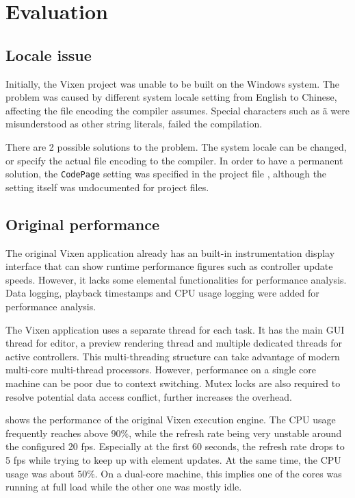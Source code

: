 \chapter{Evaluation}
\renewcommand{\baselinestretch}{\mystretch}
\label{chap:Eval}

\section{Locale issue}

Initially, the Vixen project was unable to be built on the Windows system. The problem was caused by different system locale setting from English to Chinese, affecting the file encoding the compiler assumes. Special characters such as \"a were misunderstood as other string literals, failed the compilation.

There are 2 possible solutions to the problem. The system locale can be changed, or specify the actual file encoding to the compiler. In order to have a permanent solution, the \texttt{CodePage} setting was specified in the project file \cite{codepage}, although the setting itself was undocumented for project files.

\section{Original performance}

The original Vixen application already has an built-in instrumentation display interface that can show runtime performance figures such as controller update speeds. However, it lacks some elemental functionalities for performance analysis. Data logging, playback timestamps and CPU usage logging were added for performance analysis.

The Vixen application uses a separate thread for each task. It has the main GUI thread for editor, a preview rendering thread and multiple dedicated threads for active controllers. This multi-threading structure can take advantage of modern multi-core multi-thread processors. However, performance on a single core machine can be poor due to context switching. Mutex locks are also required to resolve potential data access conflict, further increases the overhead.

 shows the performance of the original Vixen execution engine. The CPU usage frequently reaches above $90 \%$, while the refresh rate being very unstable around the configured 20 fps. Especially at the first 60 seconds, the refresh rate drops to 5 fps while trying to keep up with element updates. At the same time, the CPU usage was about $50 \%$. On a dual-core machine, this implies one of the cores was running at full load while the other one was mostly idle. 


